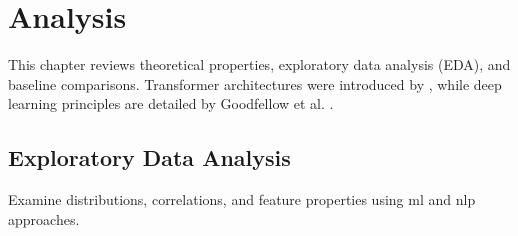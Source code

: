 \chapter{Analysis}
\label{ch:analysis}

This chapter reviews theoretical properties, exploratory data analysis (EDA), and baseline comparisons. Transformer architectures were introduced by \cite{vaswani2017attention}, while deep learning principles are detailed by Goodfellow et al. \cite{goodfellow2016deep}.

\section{Exploratory Data Analysis}
Examine distributions, correlations, and feature properties using \gls{ml} and \gls{nlp} approaches.